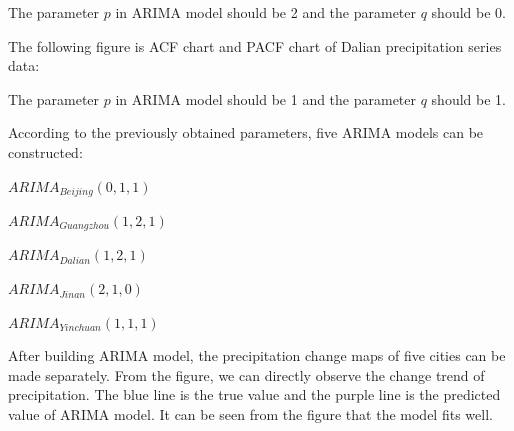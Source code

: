\documentclass{swmcmthesis}
\begin{document}
\par 
The parameter $p$ in ARIMA model should be 2 and the parameter $q$ should be 0.
\par
The following figure is ACF chart and PACF chart of Dalian precipitation series data:
\begin{figure}[h!t]
    \centering
    \hfill
\end{figure}
\par 
The parameter $p$ in ARIMA model should be 1 and the parameter $q$ should be 1.
\par
According to the previously obtained parameters, five ARIMA models can be constructed:
\par
\begin{center}
    \par
    $ARIMA_{Beijing}(0,1,1)$
    \par 
    $ARIMA_{Guangzhou}(1,2,1)$
    \par 
    $ARIMA_{Dalian}(1,2,1)$
    \par 
    $ARIMA_{Jinan}(2,1,0)$
    \par 
    $ARIMA_{Yinchuan}(1,1,1)$
\end{center}
\par 
After building ARIMA model, the precipitation change maps of five cities can be made separately. From the figure, we can directly observe the change trend of precipitation. The blue line is the true value and the purple line is the predicted value of ARIMA model. It can be seen from the figure that the model fits well.
\end{document}
